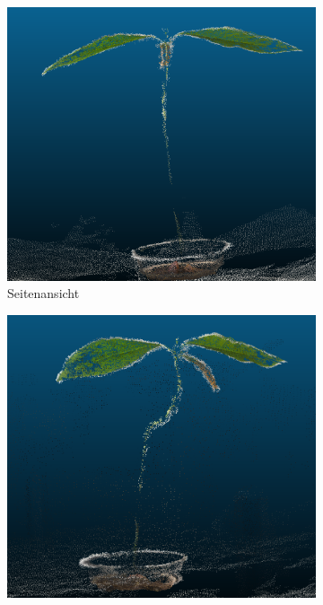 \documentclass[12pt,titlepage, twoside]{article}
\begin{document}
\begin{figure}
    \centering 
\begin{subfigure}{0.45\textwidth}
  \includegraphics[width=\linewidth]{./Images/OdmFlatError1.png}
  \caption{Seitenansicht}
  \label{fig:handcrafted:classifier:odm:error:1}
\end{subfigure}\hfil
\begin{subfigure}{0.45\textwidth}
  \includegraphics[width=\linewidth]{./Images/OdmFlatError2.png}

\end{subfigure}
\end{figure}
\end{document}
